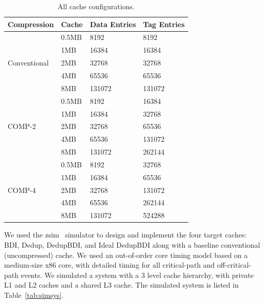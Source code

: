 \begin{table}[]
    \centering
    \begin{tabular}{|l|l|l|l|}
    \hline
    Compression                   & Cache & Data Entries & Tag Entries \\ \hline
    \multirow{5}{*}{Conventional} & 0.5MB & 8192         & 8192        \\ \cline{2-4} 
                                    & 1MB   & 16384        & 16384       \\ \cline{2-4} 
                                    & 2MB   & 32768        & 32768       \\ \cline{2-4} 
                                    & 4MB   & 65536        & 65536       \\ \cline{2-4} 
                                    & 8MB   & 131072       & 131072      \\ \hline
    \multirow{5}{*}{COMP-2}       & 0.5MB & 8192         & 16384       \\ \cline{2-4} 
                                    & 1MB   & 16384        & 32768       \\ \cline{2-4} 
                                    & 2MB   & 32768        & 65536       \\ \cline{2-4} 
                                    & 4MB   & 65536        & 131072      \\ \cline{2-4} 
                                    & 8MB   & 131072       & 262144      \\ \hline
    \multirow{5}{*}{COMP-4}       & 0.5MB & 8192         & 32768       \\ \cline{2-4} 
                                    & 1MB   & 16384        & 65536       \\ \cline{2-4} 
                                    & 2MB   & 32768        & 131072      \\ \cline{2-4} 
                                    & 4MB   & 65536        & 262144      \\ \cline{2-4} 
                                    & 8MB   & 131072       & 524288      \\ \cline{2-4} 
    \end{tabular}
    \caption{All cache configurations.}
    \label{tab:simcache}
\end{table}
We used the zsim~\cite{zsim} simulator to design and implement the four target caches: BDI, Dedup, DedupBDI, and Ideal DedupBDI along with a baseline conventional (uncompressed) cache. We used an out-of-order core timing model based on a medium-size x86 core, with detailed timing for all critical-path and off-critical-path events. We simulated a system with a 3 level cache hierarchy, with private L1 and L2 caches and a shared L3 cache. The simulated system is listed in Table~\ref{tab:simsys}.\par 
